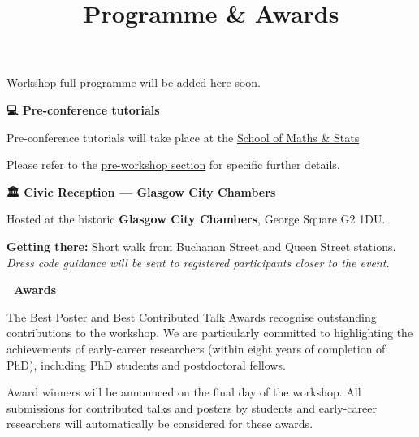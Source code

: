 \documentclass[
  letterpaper,
  DIV=11,
  numbers=noendperiod]{scrartcl}
\title{Programme \& Awards}
\author{}
\date{}
\begin{document}
\maketitle


Workshop full programme will be added here soon.

\begin{tcolorbox}[enhanced jigsaw, arc=.35mm, bottomrule=.15mm, breakable, colback=white, colframe=quarto-callout-note-color-frame, left=2mm, leftrule=.75mm, opacityback=0, rightrule=.15mm, toprule=.15mm]

\vspace{-3mm}\textbf{💻 Pre-conference tutorials}\vspace{3mm}

Pre-conference tutorials will take place at the
\href{accomodation.qmd\#venue}{School of Maths \& Stats}

Please refer to the \href{workshops.qmd}{pre-workshop section} for
specific further details.

\end{tcolorbox}

\begin{tcolorbox}[enhanced jigsaw, arc=.35mm, bottomrule=.15mm, breakable, colback=white, colframe=quarto-callout-note-color-frame, left=2mm, leftrule=.75mm, opacityback=0, rightrule=.15mm, toprule=.15mm]

\vspace{-3mm}\textbf{🏛️ Civic Reception --- Glasgow City Chambers}\vspace{3mm}

Hosted at the historic \textbf{Glasgow City Chambers}, George Square G2
1DU.

\textbf{Getting there:} Short walk from Buchanan Street and Queen Street
stations.\\
\emph{Dress code guidance will be sent to registered participants closer
to the event.}

\end{tcolorbox}

\begin{tcolorbox}[enhanced jigsaw, arc=.35mm, bottomrule=.15mm, breakable, colback=white, colframe=quarto-callout-note-color-frame, left=2mm, leftrule=.75mm, opacityback=0, rightrule=.15mm, toprule=.15mm]

\vspace{-3mm}\textbf{🏅 Awards}\vspace{3mm}

The Best Poster and Best Contributed Talk Awards recognise outstanding
contributions to the workshop. We are particularly committed to
highlighting the achievements of early-career researchers (within eight
years of completion of PhD), including PhD students and postdoctoral
fellows.

Award winners will be announced on the final day of the workshop. All
submissions for contributed talks and posters by students and
early-career researchers will automatically be considered for these
awards.

\end{tcolorbox}
\end{document}
